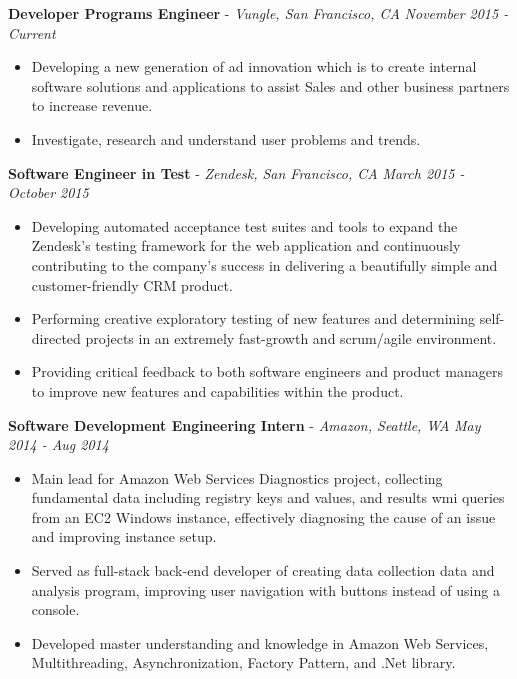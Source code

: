 \documentclass[9pt]{extarticle}
\begin{document}
\begin{body}
\vspace{1pt}

\textbf{Developer Programs Engineer} - 
\emph{Vungle, San Francisco, CA} 
\hfill 
\emph{November 2015 - Current}\\
\vspace*{-4pt}
\begin{itemize} 
\itemsep -0pt
    \item Developing a new generation of ad innovation which is to create internal software solutions and applications to assist Sales and other business partners to increase revenue.
    \item Investigate, research and understand user problems and trends.

\end{itemize}

\textbf{Software Engineer in Test} - 
\emph{Zendesk, San Francisco, CA} 
\hfill 
\emph{March 2015 - October 2015}\\
\vspace*{-4pt}
\begin{itemize} 
\itemsep -0pt
    \item  Developing automated acceptance test suites and tools to expand the Zendesk's testing framework for the web application and continuously contributing to the company's success in delivering a beautifully simple and customer-friendly CRM product.
	\item Performing creative exploratory testing of new features  and determining self-directed projects in an extremely fast-growth and scrum/agile environment. 
	\item Providing critical feedback to both software engineers and product managers to improve new features and capabilities within the product.
\end{itemize}	



\textbf{Software Development Engineering Intern} - 
\emph{Amazon, Seattle, WA} 
\hfill 
\emph{May 2014 - Aug 2014}\\
\vspace*{-4pt}
\begin{itemize} 
\itemsep -0pt
  \item Main lead for Amazon Web Services Diagnostics project, collecting fundamental data including registry keys and values, and results wmi queries from an EC2 Windows instance, effectively diagnosing the cause of an issue and improving instance setup.
  \item Served as full-stack back-end developer of creating data collection data and analysis program, improving user navigation with buttons instead of using a console.
  \item Developed master understanding and knowledge in Amazon Web Services, Multithreading, Asynchronization, Factory Pattern, and .Net library. 
\end{itemize}

\end{body}
\end{document}
